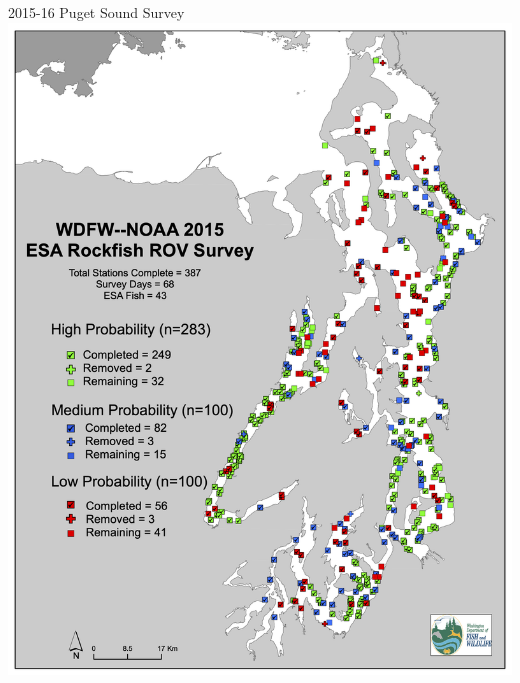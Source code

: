 \documentclass[
  ignorenonframetext,
]{beamer}
\begin{document}
\begin{frame}{2015-16 Puget Sound Survey}
\protect\hypertarget{puget-sound-survey}{}
\includegraphics[width=1\textwidth,height=\textheight]{2015_PS_map.png}


\end{frame}
\end{document}
